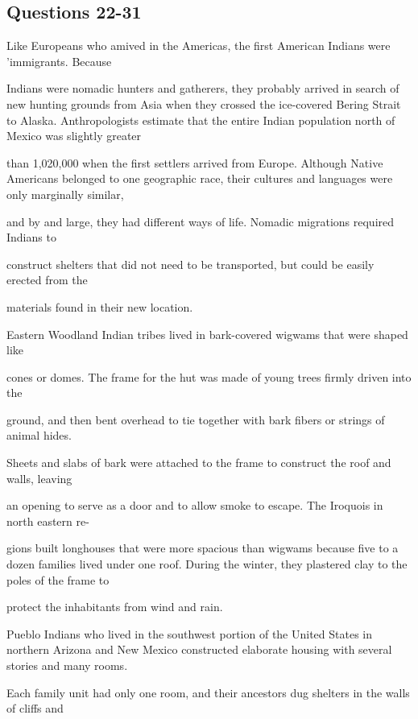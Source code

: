 \documentclass[12pt]{article}
\begin{document}
\subsection*{Questions 22-31}
\begingroup
\small
\sloppy
\setlength{\parskip}{0pt}
\setlength{\parindent}{0pt}
Like Europeans who amived in the Americas, the first American Indians were 'immigrants. Because\par
Indians were nomadic hunters and gatherers, they probably arrived in search of new hunting grounds from Asia when they crossed the ice-covered Bering Strait to Alaska. Anthropologists estimate that the entire Indian population north of Mexico was slightly greater\par
than 1,020,000 when the first settlers arrived from Europe. Although Native Americans belonged to one geographic race, their cultures and languages were only marginally similar,\par
and by and large, they had different ways of life. Nomadic migrations required Indians to\par
construct shelters that did not need to be transported, but could be easily erected from the\par
materials found in their new location.\par
Eastern Woodland Indian tribes lived in bark-covered wigwams that were shaped like\par
cones or domes. The frame for the hut was made of young trees firmly driven into the\par
ground, and then bent overhead to tie together with bark fibers or strings of animal hides.\par
Sheets and slabs of bark were attached to the frame to construct the roof and walls, leaving\par
an opening to serve as a door and to allow smoke to escape. The Iroquois in north eastern re-\par
gions built longhouses that were more spacious than wigwams because five to a dozen families lived under one roof. During the winter, they plastered clay to the poles of the frame to\par
protect the inhabitants from wind and rain.\par
Pueblo Indians who lived in the southwest portion of the United States in northern Arizona and New Mexico constructed elaborate housing with several stories and many rooms.\par
Each family unit had only one room, and their ancestors dug shelters in the walls of cliffs and\par
\end{document}
